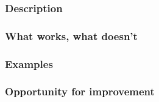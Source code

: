 \subsubsection{Description}
\subsubsection{What works, what doesn't}
\subsubsection{Examples}
\subsubsection{Opportunity for improvement}
